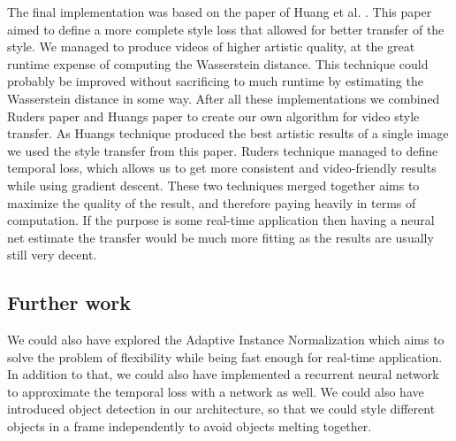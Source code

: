 The final implementation was based on the paper of Huang et al. \cite{Huang:1}. This paper aimed to define a more complete style loss that allowed for better transfer of the style. We managed to produce videos of higher artistic quality, at the great runtime expense of computing the Wasserstein distance. This technique could probably be improved without sacrificing to much runtime by estimating the Wasserstein distance in some way. \newline\newline
After all these implementations we combined Ruders paper \cite{Ruder:1} and Huangs paper \cite{Huang:1} to create our own algorithm for video style transfer. As Huangs technique produced the best artistic results of a single image we used the style transfer from this paper. Ruders technique managed to define temporal loss, which allows us to get more consistent and video-friendly results while using gradient descent. These two techniques merged together aims to maximize the quality of the result, and therefore paying heavily in terms of computation. If the purpose is some real-time application then having a neural net estimate the transfer would be much more fitting as the results are usually still very decent. 
\subsection{Further work}
We could also have explored the Adaptive Instance Normalization \cite{Huang:2} which aims to solve the problem of flexibility while being fast enough for real-time application. In addition to that, we could also have implemented a recurrent neural network to approximate the temporal loss with a network as well. We could also have introduced object detection in our architecture, so that we could style different objects in a frame independently to avoid objects melting together.
\newpage
